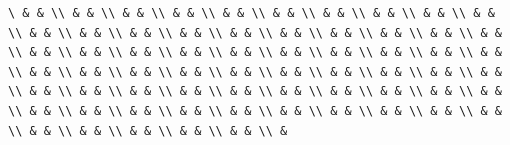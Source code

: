 \documentclass[
  ukrainian,
]{article}
\begin{document}
\begin{verbatim}
\ & & \\ & & \\ & & \\ & & \\ & & \\ & & \\ & & \\ & & \\ & & \\ & & \\ & & \\ & & \\ & & \\ & & \\ & & \\ & & \\ & & \\ & & \\ & & \\ & & \\ & & \\ & & \\ & & \\ & & \\ & & \\ & & \\ & & \\ & & \\ & & \\ & & \\ & & \\ & & \\ & & \\ & & \\ & & \\ & & \\ & & \\ & & \\ & & \\ & & \\ & & \\ & & \\ & & \\ & & \\ & & \\ & & \\ & & \\ & & \\ & & \\ & & \\ & & \\ & & \\ & & \\ & & \\ & & \\ & & \\ & & \\ & & \\ & & \\ & & \\ & & \\ & & \\ & & \\ & & \\ & & \\ & 
\end{verbatim}
\end{document}
